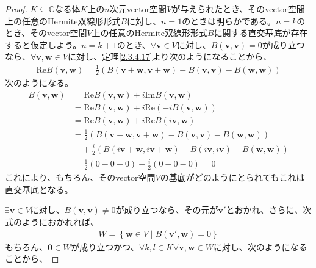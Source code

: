 \documentclass[dvipdfmx]{jsarticle}
\begin{document}
\begin{proof}
$K \subseteq \mathbb{C}$なる体$K$上の$n$次元vector空間$V$が与えられたとき、そのvector空間上の任意のHermite双線形形式$B$に対し、$n = 1$のときは明らかである。$n = k$のとき、そのvector空間$V$上の任意のHermite双線形形式$B$に関する直交基底が存在すると仮定しよう。$n = k + 1$のとき、$\forall\mathbf{v} \in V$に対し、$B\left( \mathbf{v},\mathbf{v} \right) = 0$が成り立つなら、$\forall\mathbf{v},\mathbf{w} \in V$に対し、定理\ref{2.3.4.17}より次のようになることから、
\begin{align*}
{\mathrm{Re}}{B\left( \mathbf{v},\mathbf{w} \right)} = \frac{1}{2}\left( B\left( \mathbf{v} + \mathbf{w},\mathbf{v} + \mathbf{w} \right) - B\left( \mathbf{v},\mathbf{v} \right) - B\left( \mathbf{w},\mathbf{w} \right) \right)
\end{align*}
次のようになる。
\begin{align*}
B\left( \mathbf{v},\mathbf{w} \right) &= {\mathrm{Re}}{B\left( \mathbf{v},\mathbf{w} \right)} + i{\mathrm{Im}}{B\left( \mathbf{v},\mathbf{w} \right)}\\
&= {\mathrm{Re}}{B\left( \mathbf{v},\mathbf{w} \right)} + i{\mathrm{Re}}\left( - iB\left( \mathbf{v},\mathbf{w} \right) \right)\\
&= {\mathrm{Re}}{B\left( \mathbf{v},\mathbf{w} \right)} + i{\mathrm{Re}}{B\left( i\mathbf{v},\mathbf{w} \right)}\\
&= \frac{1}{2}\left( B\left( \mathbf{v} + \mathbf{w},\mathbf{v} + \mathbf{w} \right) - B\left( \mathbf{v},\mathbf{v} \right) - B\left( \mathbf{w},\mathbf{w} \right) \right) \\
&\quad + \frac{i}{2}\left( B\left( i\mathbf{v} + \mathbf{w},i\mathbf{v} + \mathbf{w} \right) - B\left( i\mathbf{v},i\mathbf{v} \right) - B\left( \mathbf{w},\mathbf{w} \right) \right)\\
&= \frac{1}{2}(0 - 0 - 0) + \frac{i}{2}(0 - 0 - 0) = 0
\end{align*}
これにより、もちろん、そのvector空間$V$の基底がどのようにとられてもこれは直交基底となる。\par
$\exists\mathbf{v} \in V$に対し、$B\left( \mathbf{v},\mathbf{v} \right) \neq 0$が成り立つなら、その元が$\mathbf{v}'$とおかれ、さらに、次式のようにおかれれば、
\begin{align*}
W = \left\{ \mathbf{w} \in V \middle| B\left( \mathbf{v}',\mathbf{w} \right) = 0 \right\}
\end{align*}
もちろん、$\mathbf{0} \in W$が成り立つかつ、$\forall k,l \in K\forall\mathbf{v},\mathbf{w} \in W$に対し、次のようになることから、

\end{proof}
\end{document}
